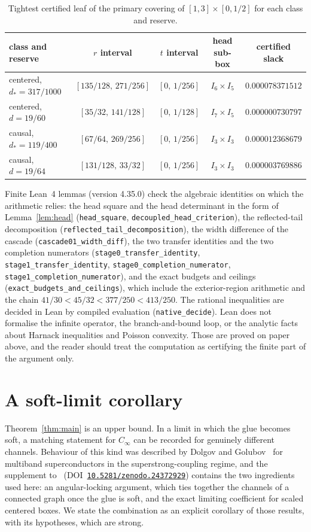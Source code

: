 \documentclass[10pt]{article}
\theoremstyle{remark}
\newcommand{\DOI}[1]{\href{https://doi.org/#1}{\nolinkurl{#1}}}
\newcommand{\us}{\_\allowbreak}
\newcommand{\Cinf}{C_\infty}
\newcommand{\dstar}{d_{*}}
\begin{document}
\begin{table}[t]
\centering
\begin{tabular}{@{}lcccc@{}}
\hline
class and reserve & $r$ interval & $t$ interval & head sub-box & certified slack \\
\hline
centered, $\dstar=317/1000$ & $[135/128,\,271/256]$ & $[0,\,1/256]$ & $I_6\times I_5$ & $0.000078371512$ \\
centered, $d=19/60$ & $[35/32,\,141/128]$ & $[0,\,1/128]$ & $I_7\times I_5$ & $0.000000730797$ \\
causal, $\dstar=119/400$ & $[67/64,\,269/256]$ & $[0,\,1/256]$ & $I_3\times I_3$ & $0.000012368679$ \\
causal, $d=19/64$ & $[131/128,\,33/32]$ & $[0,\,1/256]$ & $I_3\times I_3$ & $0.000003769886$ \\
\hline
\end{tabular}
\caption{Tightest certified leaf of the primary covering of $[1,3]\times[0,1/2]$ for each class and reserve.}\label{tab:slack}
\end{table}

Finite Lean~4 lemmas (version 4.35.0) check the algebraic identities on which the arithmetic relies: the head square and the head determinant in the form of Lemma~\ref{lem:head} (\texttt{head\us square}, \texttt{decoupled\us head\us criterion}), the reflected-tail decomposition (\texttt{reflected\us tail\us decomposition}), the width difference of the cascade (\texttt{cascade01\us width\us diff}), the two transfer identities and the two completion numerators (\texttt{stage0\us transfer\us identity}, \texttt{stage1\us transfer\us identity}, \texttt{stage0\us completion\us numerator}, \texttt{stage1\us completion\us numerator}), and the exact budgets and ceilings (\texttt{exact\us budgets\us and\us ceilings}), which include the exterior-region arithmetic and the chain $41/30<45/32<377/250<413/250$. The rational inequalities are decided in Lean by compiled evaluation (\texttt{native\us decide}). Lean does not formalise the infinite operator, the branch-and-bound loop, or the analytic facts about Harnack inequalities and Poisson convexity. Those are proved on paper above, and the reader should treat the computation as certifying the finite part of the argument only.

\section{A soft-limit corollary}\label{sec:soft}

Theorem~\ref{thm:main} is an upper bound. In a limit in which the glue becomes soft, a matching statement for $\Cinf$ can be recorded for genuinely different channels. Behaviour of this kind was described by Dolgov and Golubov~\cite{dolgov} for multiband superconductors in the superstrong-coupling regime, and the supplement to~\cite{predecessor} (DOI~\DOI{10.5281/zenodo.24372929}) contains the two ingredients used here: an angular-locking argument, which ties together the channels of a connected graph once the glue is soft, and the exact limiting coefficient for scaled centered boxes. We state the combination as an explicit corollary of those results, with its hypotheses, which are strong.
\end{document}

